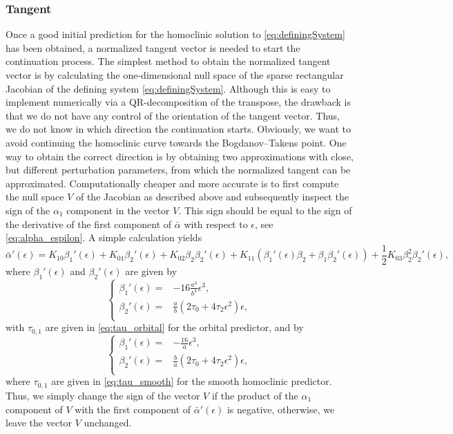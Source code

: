 \subsubsection{Tangent}
Once a good initial prediction for the homoclinic solution to
\cref{eq:definingSystem} has been obtained, a normalized tangent vector is
needed to start the continuation process. The simplest method to obtain the
normalized tangent vector is by calculating the one-dimensional null space of
the sparse rectangular Jacobian of the defining system \cref{eq:definingSystem}.
Although this is easy to implement numerically via a QR-decomposition of the
transpose, the drawback is that we do not have any control of the orientation
of the tangent vector. Thus, we do not know in which direction the continuation
starts.  Obviously, we want to avoid continuing the homoclinic curve towards
the Bogdanov--Takens point. One way to obtain the correct direction is by
obtaining two approximations with close, but different perturbation parameters,
from which the normalized tangent can be approximated.  Computationally cheaper
and more accurate is to first compute the null space $V$ of the Jacobian as
described above and subsequently inspect the sign of the $\alpha_1$ component
in the vector $V$. This sign should be equal to the sign of the derivative of
the first component of $\bar\alpha$ with respect to $\epsilon$, see
\cref{eq:alpha_espilon}. A simple calculation yields
\[
\bar\alpha'(\epsilon)  = K_{10} \beta_1'(\epsilon) + K_{01} \beta_2'(\epsilon) +
     K_{02} \beta_2 \beta_2'(\epsilon) + K_{11} (\beta_1'(\epsilon) \beta_2 +
     \beta_1 \beta_2'(\epsilon)) + \frac{1}{2} K_{03}\beta_2^2 \beta_2'(\epsilon),
\] 
where $\beta_1'(\epsilon)$ and $\beta_2'(\epsilon)$ are given by
\[
\left\{
\begin{aligned}
    \beta_1'(\epsilon) ={}& -16 \frac{a^3}{b^4} \epsilon^3, \\
    \beta_2'(\epsilon) ={}& \frac{a}{b} (2 \tau_0 + 4 \tau_2 \epsilon^2) \epsilon, \\
\end{aligned}
\right.
\] 
with $\tau_{0,1}$ are given in \cref{eq:tau_orbital} for the orbital
predictor, and by
\[
\left\{
\begin{aligned}
    \beta_1'(\epsilon) ={}&  -\frac{16}{a} \epsilon^3, \\
    \beta_2'(\epsilon) ={}& \frac{b}{a} (2 \tau_0 + 4 \tau_2 \epsilon^2) \epsilon, \\
\end{aligned}
\right.
\] 
where $\tau_{0,1}$ are given in \cref{eq:tau_smooth} for the smooth homoclinic
predictor. Thus, we simply change the sign of the vector $V$ if the product of
the $\alpha_1$ component of $V$ with the first component of $\bar\alpha'(\epsilon)$
is negative, otherwise, we leave the vector $V$ unchanged.


